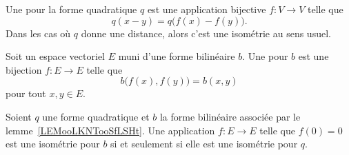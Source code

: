 \begin{definition}      \label{DEFooECTUooRxBhHf}
    Une  pour la forme quadratique \( q\) est une application bijective \( f\colon V\to V\) telle que 
    \begin{equation}
     q(x-y)=q\big( f(x)-f(y) \big).
    \end{equation}
     Dans les cas où \( q\) donne une distance, alors c'est une isométrie au sens usuel.
\end{definition}

\begin{definition}      \label{DEFooIQURooMeQuqX}
    Soit un espace vectoriel \( E\) muni d'une forme bilinéaire \( b\). Une  pour \( b\) est une bijection \( f\colon E\to E\) telle que
    \begin{equation}
        b\big( f(x),f(y) \big)=b(x,y)
    \end{equation}
    pour tout \( x,y\in E\).
\end{definition}

\begin{lemma}   \label{LemewGJmM}
    Soient \( q\) une forme quadratique et \( b\) la forme bilinéaire associée par le lemme~\ref{LEMooLKNTooSfLSHt}. Une application \( f\colon E\to E\) telle que \( f(0)=0\) est une isométrie pour \( b\) si et seulement si elle est une isométrie pour \( q\).
\end{lemma}


